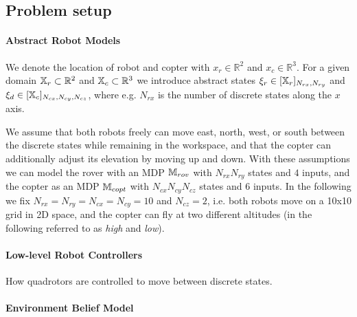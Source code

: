 \documentclass[conference]{IEEEtran}
\begin{document}
\subsection{Problem setup}

\paragraph{Abstract Robot Models}

We denote the location of robot and copter with $x_r \in \mathbb{R}^2$ and $x_c \in \mathbb{R}^3$. For a given domain $\mathbb{X}_r \subset \mathbb{R}^2$ and $\mathbb{X}_c \subset \mathbb{R}^3$ we introduce abstract states $\xi_r \in [\mathbb{X}_r]_{N_{rx}, N_{ry}}$ and $\xi_d \in [\mathbb{X}_c]_{N_{cx}, N_{cy}, N_{cz}}$, where e.g. $N_{rx}$ is the number of discrete states along the $x$ axis. 

We assume that both robots freely can move east, north, west, or south between the discrete states while remaining in the workspace, and that the copter can additionally adjust its elevation by moving up and down. With these assumptions we can model the rover with an MDP $\mathbb{M}_{rov}$ with $N_{rx} N_{ry}$ states and $4$ inputs, and the copter as an MDP $\mathbb{M}_{copt}$ with $N_{cx} N_{cy} N_{cz}$ states and $6$ inputs. In the following we fix $N_{rx} = N_{ry} = N_{cx} = N_{cy} = 10$ and $N_{cz} = 2$, i.e. both robots move on a 10x10 grid in 2D space, and the copter can fly at two different altitudes (in the following referred to as \emph{high} and \emph{low}).

\paragraph{Low-level Robot Controllers}

How quadrotors are controlled to move between discrete states.


\paragraph{Environment Belief Model}
\end{document}
